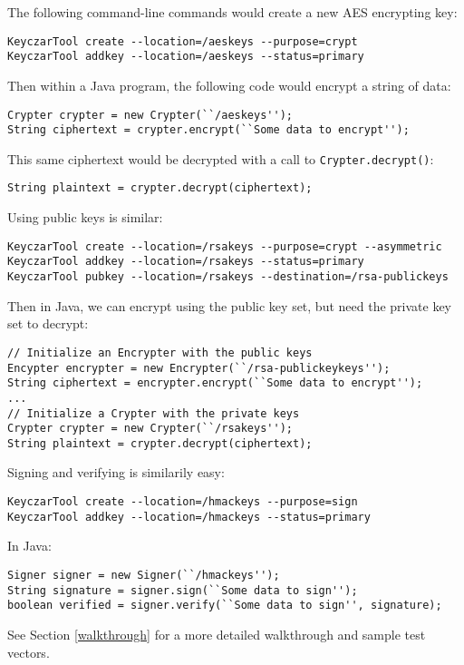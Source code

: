 \documentclass{llncs}
\begin{document}
The following command-line commands would create a new AES encrypting key:
\begin{verbatim}
KeyczarTool create --location=/aeskeys --purpose=crypt
KeyczarTool addkey --location=/aeskeys --status=primary
\end{verbatim}

Then within a Java program, the following code would encrypt a string of data:
\begin{verbatim}
Crypter crypter = new Crypter(``/aeskeys'');
String ciphertext = crypter.encrypt(``Some data to encrypt'');
\end{verbatim}

This same ciphertext would be decrypted with a call to {\tt Crypter.decrypt()}:
\begin{verbatim}
String plaintext = crypter.decrypt(ciphertext);
\end{verbatim}

Using public keys is similar:
\begin{verbatim}
KeyczarTool create --location=/rsakeys --purpose=crypt --asymmetric
KeyczarTool addkey --location=/rsakeys --status=primary
KeyczarTool pubkey --location=/rsakeys --destination=/rsa-publickeys
\end{verbatim}

Then in Java, we can encrypt using the public key set, but need the private key
set to decrypt:
\begin{verbatim}
// Initialize an Encrypter with the public keys
Encypter encrypter = new Encrypter(``/rsa-publickeykeys'');
String ciphertext = encrypter.encrypt(``Some data to encrypt'');
... 
// Initialize a Crypter with the private keys
Crypter crypter = new Crypter(``/rsakeys'');
String plaintext = crypter.decrypt(ciphertext);
\end{verbatim}

Signing and verifying is similarily easy:
\begin{verbatim}
KeyczarTool create --location=/hmackeys --purpose=sign
KeyczarTool addkey --location=/hmackeys --status=primary
\end{verbatim}

In Java:
\begin{verbatim}
Signer signer = new Signer(``/hmackeys'');
String signature = signer.sign(``Some data to sign'');
boolean verified = signer.verify(``Some data to sign'', signature);
\end{verbatim}

See Section \ref{walkthrough} for a more detailed walkthrough and sample test
vectors.
\end{document}
